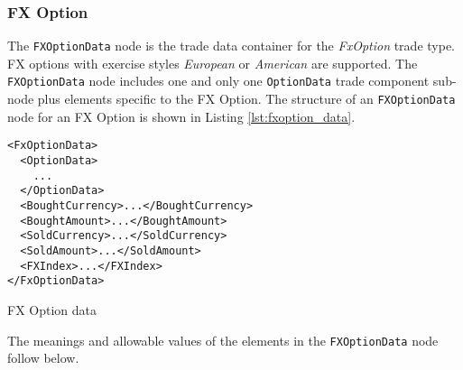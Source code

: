 \subsubsection{FX Option}

The \lstinline!FXOptionData! node is the trade data container for the \emph{FxOption} trade type. FX options with exercise styles \emph{European} or \emph{American} are supported. 
The \lstinline!FXOptionData! node includes one and only one \lstinline!OptionData! trade
component sub-node plus elements specific to the FX Option. The structure of an \lstinline!FXOptionData! node
for an FX Option is shown in Listing \ref{lst:fxoption_data}.

\begin{listing}[H]
\begin{verbatim}
<FxOptionData>
  <OptionData>
    ...
  </OptionData>
  <BoughtCurrency>...</BoughtCurrency>
  <BoughtAmount>...</BoughtAmount>
  <SoldCurrency>...</SoldCurrency>
  <SoldAmount>...</SoldAmount>
  <FXIndex>...</FXIndex>
</FxOptionData>
\end{verbatim}
\caption{FX Option data}
\label{lst:fxoption_data}
\end{listing}

The meanings and allowable values of the elements in the \lstinline!FXOptionData! node follow below.


